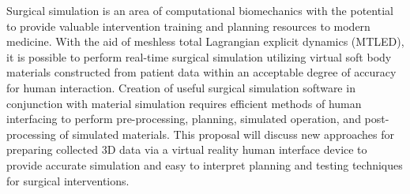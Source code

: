 \begin{comment}
Background Information
Creates a clear picture of the field

Problem Statement
The problem is stated clearly and specifically
Intended Contribution
The intended contribution is stated clearly and specifically

Extent of Review
The review is extensive and focused

Structure of Review
The structure is logical and leads to the identified problem and proposed method of research

Appropriate Sources
The sources are scholarly and or professional

Explanation of Method
It is clear how the research will be carried out

Identification of Resources
All necessary resources have been identified and their requirement justified 

Timeline to Completion
The timeline is realistic and detailed

Quality of Writing 
The writing is excellent

Citations
All sources have been cited

Appropriate Length 
The length is appropriate (body of document 2000-3000 words)
\end{comment}
Surgical simulation is an area of computational biomechanics with the potential to provide valuable intervention training and planning resources to modern medicine. With the aid of meshless total Lagrangian explicit dynamics (MTLED), it is possible to perform real-time surgical simulation utilizing virtual soft body materials constructed from patient data within an acceptable degree of accuracy for human interaction. Creation of useful surgical simulation software in conjunction with material simulation requires efficient methods of human interfacing to perform pre-processing, planning, simulated operation, and post-processing of simulated materials. This proposal will discuss new approaches for preparing collected 3D data via a virtual reality human interface device to provide accurate simulation and easy to interpret planning and testing techniques for surgical interventions.